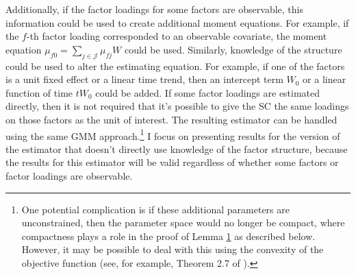 \documentclass{article}
\begin{document}
\par
Additionally, if the factor loadings for some factors are observable, this information could be used to create additional moment equations. For example, if the $f$-th factor loading corresponded to an observable covariate, the moment equation $\mu_{f0} = \sum_{j \in \mathcal{J}} \mu_{fj} W$ could be used. Similarly, knowledge of the structure could be used to alter the estimating equation. For example, if one of the factors is a unit fixed effect or a linear time trend, then an intercept term $W_0$ or a linear function of time $t W_0$ could be added. If some factor loadings are estimated directly, then it is not required that it's possible to give the SC the same loadings on those factors as the unit of interest. The resulting estimator can be handled using the same GMM approach.\footnote{One potential complication is if these additional parameters are unconstrained, then the parameter space would no longer be compact, where compactness plays a role in the proof of Lemma \hyperref[L1]{1} as described below. However, it may be possible to deal with this using the convexity of the objective function (see, for example, Theorem 2.7 of \cite{Newey-McFadden}).} I focus on presenting results for the version of the estimator that doesn't directly use knowledge of the factor structure, because the results for this estimator will be valid regardless of whether some factors or factor loadings are observable.
\par 
\end{document}
